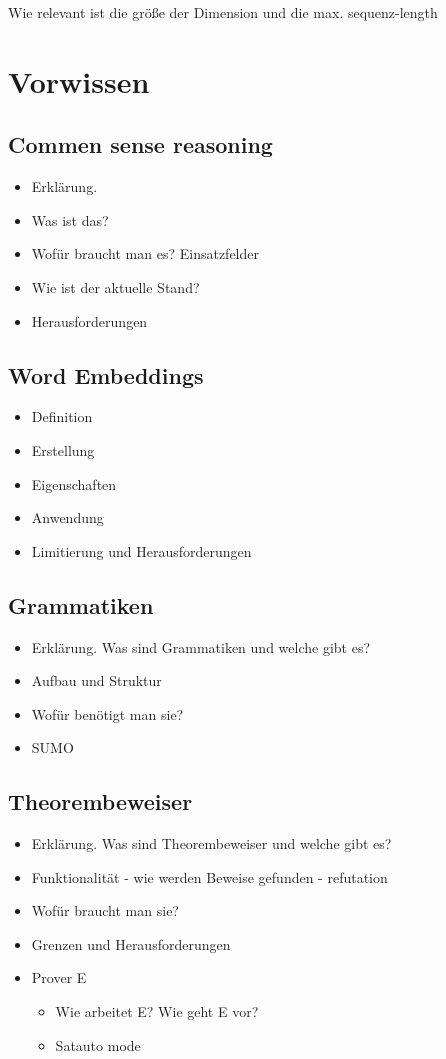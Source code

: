 \documentclass[german,version-2020-11]{uzl-thesis}
\begin{document}
Wie relevant ist die größe der Dimension und die max. sequenz-length
\chapter{Vorwissen}
  \section{Commen sense reasoning}
    \begin{itemize}
      \item Erklärung.
      \item Was ist das?
      \item Wofür braucht man es? Einsatzfelder
      \item Wie ist der aktuelle Stand?
      \item Herausforderungen
    \end{itemize}
  \section{Word Embeddings}
    \begin{itemize}
      \item Definition
      \item Erstellung
      \item Eigenschaften
      \item Anwendung
      \item Limitierung und Herausforderungen
    \end{itemize}
  \section{Grammatiken}
    \begin{itemize}
      \item Erklärung. Was sind Grammatiken und welche gibt es?
      \item Aufbau und Struktur
      \item Wofür benötigt man sie?
      \item SUMO
    \end{itemize}
  \section{Theorembeweiser}
    \begin{itemize}
      \item Erklärung. Was sind Theorembeweiser und welche gibt es?
      \item Funktionalität - wie werden Beweise gefunden - refutation
      \item Wofür braucht man sie?
      \item Grenzen und Herausforderungen
      \item Prover E
        \begin{itemize}
          \item Wie arbeitet E? Wie geht E vor?
          \item Satauto mode 
        \end{itemize}
    \end{itemize} 
\end{document}
